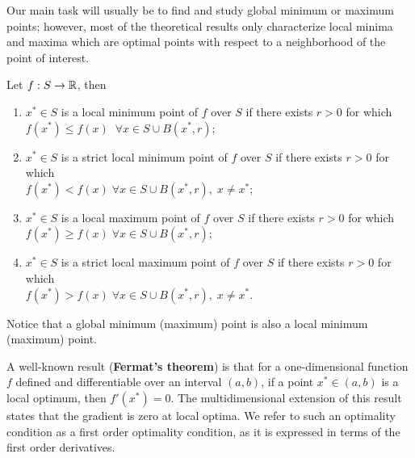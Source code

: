 \documentclass[10pt,a4paper]{article}
\begin{document}
Our main task will usually be to find and study global minimum or maximum points; however, most of the theoretical results only characterize local minima and maxima which are optimal points with respect to a neighborhood of the point of interest. 
\begin{definition} 
	Let $f:S\to \mathbb{R}$, then
	\begin{enumerate}
		\item $x^* \in S$ is a local minimum point of $f$ over $S$ if there exists $r>0$ for which \\$f(x^*)\leq f(x) \;\;\forall x \in S\cup B(x^*,r)$;
		\item $x^* \in S$ is a strict local minimum point of $f$ over $S$ if there exists $r>0$ for which \\$f(x^*)< f(x) \;\forall x \in S\cup B(x^*,r),\; x\neq x^*$;
		\item $x^* \in S$ is a local maximum point of $f$ over $S$ if there exists $r>0$ for which \\ $f(x^*)\geq f(x) \;\forall x \in S\cup B(x^*,r)$;
		\item $x^* \in S$ is a strict local maximum point of $f$ over $S$ if there exists $r>0$ for which \\ $f(x^*)> f(x) \;\forall x \in S\cup B(x^*,r),\; x\neq x^*$.
	\end{enumerate}
\end{definition}
Notice that a global minimum (maximum) point is also a local minimum (maximum) point.
\par A well-known result (\textbf{Fermat's theorem}) is that for a one-dimensional function $f$ defined and differentiable
over an interval $(a, b)$, if a point $x^*\in (a, b)$ is a local optimum, then $f'(x^*) = 0$. The multidimensional extension of this result states that the gradient is zero at local optima. We refer to such an optimality condition as a first order optimality condition, as it is expressed in terms of the first order derivatives.
\end{document}
